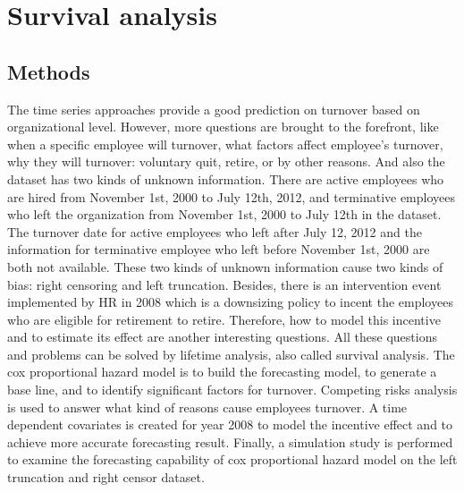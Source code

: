 \chapter{Survival analysis} \label{ch:surv}
\section{Methods}
The time series approaches provide a good prediction on turnover based on organizational level. However, more questions are brought to the forefront, like when a specific employee will turnover, what factors affect employee's turnover, why they will turnover: voluntary quit, retire, or by other reasons. And also the dataset has two kinds of unknown information. There are active employees who are hired from November 1st, 2000 to July 12th, 2012, and terminative employees who left the organization from November 1st, 2000 to July 12th in the dataset. The turnover date for active employees who left after July 12, 2012 and the information for terminative employee who left before November 1st, 2000 are both not available. These two kinds of  unknown information cause two kinds of bias: right censoring and left truncation. Besides, there is an intervention event implemented by HR in 2008 which is a downsizing policy to incent the employees who are eligible for retirement to retire. Therefore, how to model this incentive and to estimate its effect are another interesting questions. All these questions and problems can be solved by lifetime analysis, also called survival analysis. The cox proportional hazard model is to build the forecasting model, to generate a base line, and to identify significant factors for turnover. Competing risks analysis is used to answer what kind of reasons cause employees  turnover. A time dependent covariates is created for year 2008 to model the incentive effect and to achieve more accurate forecasting result. Finally, a simulation study is performed to examine the forecasting capability of cox proportional hazard model on the left truncation and right censor dataset.
